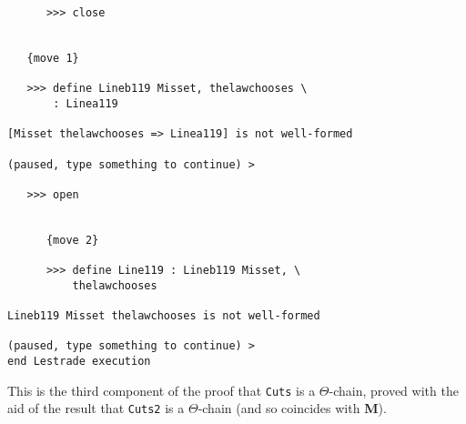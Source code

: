 \documentclass[12pt]{article}
\begin{document}
\begin{verbatim}
      >>> close


   {move 1}

   >>> define Lineb119 Misset, thelawchooses \
       : Linea119

[Misset thelawchooses => Linea119] is not well-formed

(paused, type something to continue) >

   >>> open


      {move 2}

      >>> define Line119 : Lineb119 Misset, \
          thelawchooses

Lineb119 Misset thelawchooses is not well-formed

(paused, type something to continue) >
end Lestrade execution
\end{verbatim}

This is the third component of the proof that {\tt Cuts} is a $\Theta$-chain, proved with the aid of the result that {\tt Cuts2} is a $\Theta$-chain (and so coincides with {\bf M}).
\end{document}

